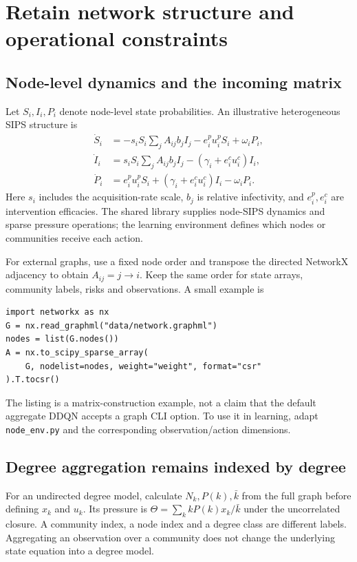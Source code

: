 \documentclass[11pt,a4paper]{article}
\theoremstyle{definition}
\theoremstyle{remark}
\begin{document}
\section{Retain network structure and operational constraints}
\subsection{Node-level dynamics and the incoming matrix}
Let $S_i,I_i,P_i$ denote node-level state probabilities. An illustrative heterogeneous SIPS structure is
\begin{align}
\dot S_i&=-s_iS_i\sum_jA_{ij}b_jI_j-e_i^pu_i^pS_i+\omega_iP_i,\nonumber\\
\dot I_i&=s_iS_i\sum_jA_{ij}b_jI_j-(\gamma_i+e_i^cu_i^c)I_i,\label{eq:node-sips}\\
\dot P_i&=e_i^pu_i^pS_i+(\gamma_i+e_i^cu_i^c)I_i-\omega_iP_i.\nonumber
\end{align}
Here $s_i$ includes the acquisition-rate scale, $b_j$ is relative infectivity, and $e_i^p,e_i^c$ are intervention efficacies. The shared library supplies node-SIPS dynamics and sparse pressure operations; the learning environment defines which nodes or communities receive each action.

For external graphs, use a fixed node order and transpose the directed NetworkX adjacency to obtain $A_{ij}=j\to i$. Keep the same order for state arrays, community labels, risks and observations. A small example is
\begin{lstlisting}
import networkx as nx
G = nx.read_graphml("data/network.graphml")
nodes = list(G.nodes())
A = nx.to_scipy_sparse_array(
    G, nodelist=nodes, weight="weight", format="csr"
).T.tocsr()
\end{lstlisting}
The listing is a matrix-construction example, not a claim that the default aggregate DDQN accepts a graph CLI option. To use it in learning, adapt \texttt{node\_env.py} and the corresponding observation/action dimensions.

\subsection{Degree aggregation remains indexed by degree}
For an undirected degree model, calculate $N_k,P(k),\bar k$ from the full graph before defining $x_k$ and $u_k$. Its pressure is $\Theta=\sum_k kP(k)x_k/\bar k$ under the uncorrelated closure. A community index, a node index and a degree class are different labels. Aggregating an observation over a community does not change the underlying state equation into a degree model.
\end{document}
